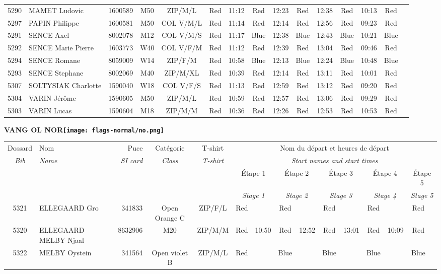 \documentclass{report}
\begin{document}
\begin{longtable}{|c|l|r|c|c|*{5}{cc|}}
    5290 & MAMET Ludovic & 1600589 & M50 & ZIP/M/L & Red & 11:12 & Red & 12:23 & Red & 12:38 & Red & 10:13 & Red &  \\
    5297 & PAPIN Philippe & 1600581 & M50 & COL V/M/L & Red & 11:14 & Red & 12:14 & Red & 12:56 & Red & 09:23 & Red &  \\
    5291 & SENCE Axel & 8002078 & M12 & COL V/M/S & Red & 11:17 & Blue & 12:38 & Blue & 12:43 & Blue & 10:21 & Blue &  \\
    5292 & SENCE Marie Pierre & 1603773 & W40 & COL V/F/M & Red & 11:12 & Red & 12:39 & Red & 13:04 & Red & 09:46 & Red &  \\
    5294 & SENCE Romane & 8059009 & W14 & ZIP/F/M & Red & 10:58 & Blue & 12:13 & Blue & 12:24 & Blue & 10:48 & Blue &  \\
    5293 & SENCE Stephane & 8002069 & M40 & ZIP/M/XL & Red & 10:39 & Red & 12:14 & Red & 13:11 & Red & 10:01 & Red &  \\
    5307 & SOLTYSIAK Charlotte & 1590040 & W18 & COL V/F/S & Red & 11:13 & Red & 12:59 & Red & 13:12 & Red & 09:20 & Red &  \\
    5304 & VARIN Jérôme & 1590605 & M50 & ZIP/M/L & Red & 10:59 & Red & 12:57 & Red & 13:06 & Red & 09:29 & Red &  \\
    5303 & VARIN Lucas & 1590604 & M18 & ZIP/M/M & Red & 10:36 & Red & 12:26 & Red & 12:53 & Red & 10:53 & Red &  \\
  \end{longtable}
\newpage
  \Huge \centering \bfseries VANG OL  NOR\normalfont \footnotesize \sffamily \hfill \texttt{[image: flags-normal/no.png]} \newline 
  \begin{longtable}{|c|l|r|c|c|*{5}{cc|}}
    Dossard & Nom  & Puce    & Catégorie & T-shirt & \multicolumn{10}{c|}{Nom du départ et heures de départ} \\
    \itshape Bib     & \itshape Name & \itshape SI card & \itshape Class  & \itshape  T-shirt  & \multicolumn{10}{c|}{\itshape Start names and start times} \\
    \hline
    & & & & & \multicolumn{2}{c|}{Étape 1} & \multicolumn{2}{c|}{Étape 2} & \multicolumn{2}{c|}{Étape 3} & \multicolumn{2}{c|}{Étape 4} & \multicolumn{2}{c|}{Étape 5} \\
    & & & & & \multicolumn{2}{c|}{\itshape Stage 1} & \multicolumn{2}{c|}{\itshape Stage 2} & \multicolumn{2}{c|}{\itshape Stage 3} & \multicolumn{2}{c|}{\itshape Stage 4} & \multicolumn{2}{c|}{\itshape Stage 5} \\
    \hline
    5321 & ELLEGAARD Gro & 341833 & Open Orange C & ZIP/F/L & Red &   & Red &   & Red &   & Red &   & Red &  \\
    5320 & ELLEGAARD MELBY Njaal & 8632906 & M20 & ZIP/M/M & Red & 10:50 & Red & 12:52 & Red & 13:01 & Red & 10:09 & Red &  \\
    5322 & MELBY Oystein & 341564 & Open violet B & ZIP/M/L & Red &   & Blue &   & Blue &   & Blue &   & Blue &  \\
  \end{longtable}
\end{document}
